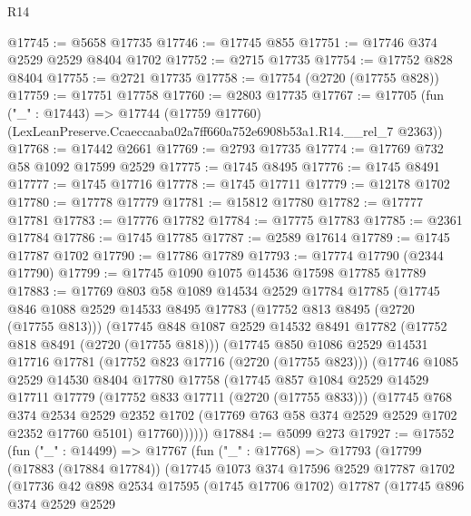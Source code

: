 \begin{lexlean}{R14}
\begin{coremodule}
@17745 := @5658 @17735
@17746 := @17745 @855
@17751 := @17746 @374 @2529 @2529 @8404 @1702
@17752 := @2715 @17735
@17754 := @17752 @828 @8404
@17755 := @2721 @17735
@17758 := @17754 (@2720 (@17755 @828))
@17759 := @17751 @17758
@17760 := @2803 @17735
@17767 := @17705
    (fun ("_" : @17443) =>
    @17744 (@17759 @17760) (LexLeanPreserve.Ccaeccaaba02a7ff660a752e6908b53a1.R14.__rel_7 @2363))
@17768 := @17442 @2661
@17769 := @2793 @17735
@17774 := @17769 @732 @58 @1092 @17599 @2529
@17775 := @1745 @8495
@17776 := @1745 @8491
@17777 := @1745 @17716
@17778 := @1745 @17711
@17779 := @12178 @1702
@17780 := @17778 @17779
@17781 := @15812 @17780
@17782 := @17777 @17781
@17783 := @17776 @17782
@17784 := @17775 @17783
@17785 := @2361 @17784
@17786 := @1745 @17785
@17787 := @2589 @17614
@17789 := @1745 @17787 @1702
@17790 := @17786 @17789
@17793 := @17774 @17790 (@2344 @17790)
@17799 := @17745 @1090 @1075 @14536 @17598 @17785 @17789
@17883 := @17769
    @803
    @58
    @1089
    @14534
    @2529
    @17784
    @17785
    (@17745
      @846
      @1088
      @2529
      @14533
      @8495
      @17783
      (@17752 @813 @8495 (@2720 (@17755 @813)))
      (@17745
        @848
        @1087
        @2529
        @14532
        @8491
        @17782
        (@17752 @818 @8491 (@2720 (@17755 @818)))
        (@17745
          @850
          @1086
          @2529
          @14531
          @17716
          @17781
          (@17752 @823 @17716 (@2720 (@17755 @823)))
          (@17746
            @1085
            @2529
            @14530
            @8404
            @17780
            @17758
            (@17745
              @857
              @1084
              @2529
              @14529
              @17711
              @17779
              (@17752 @833 @17711 (@2720 (@17755 @833)))
              (@17745
                @768
                @374
                @2534
                @2529
                @2352
                @1702
                (@17769 @763 @58 @374 @2529 @2529 @1702 @2352 @17760 @5101)
                @17760))))))
@17884 := @5099 @273
@17927 := @17552
    (fun ("_" : @14499) =>
    @17767
      (fun ("_" : @17768) =>
      @17793
        (@17799
          (@17883 (@17884 @17784))
          (@17745
            @1073
            @374
            @17596
            @2529
            @17787
            @1702
            (@17736
              @42
              @898
              @2534
              @17595
              (@1745 @17706 @1702)
              @17787
              (@17745
                @896
                @374
                @2529
                @2529

\end{coremodule}
\end{lexlean}
